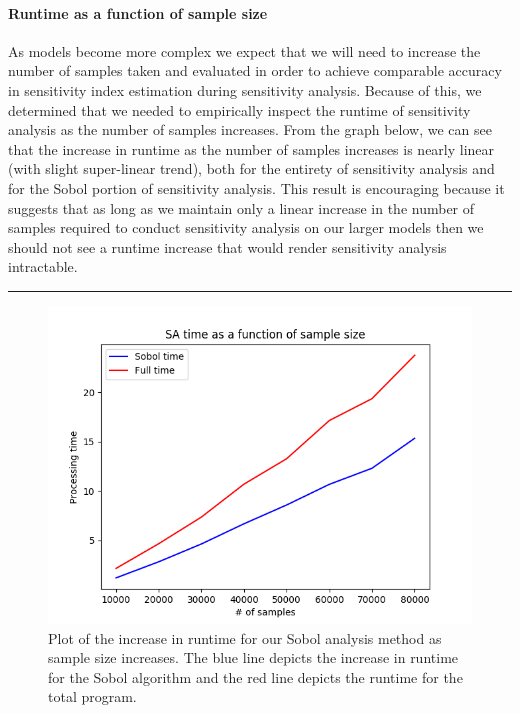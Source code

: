 \documentclass[article, 12pt, oneside]{memoir}
\begin{document}
\hypertarget{runtime-as-a-function-of-sample-size}{%
\paragraph{Runtime as a function of sample
size}\label{runtime-as-a-function-of-sample-size}}

As models become more complex we expect that we will need to increase
the number of samples taken and evaluated in order to achieve comparable
accuracy in sensitivity index estimation during sensitivity analysis.
Because of this, we determined that we needed to empirically inspect the
runtime of sensitivity analysis as the number of samples increases. From
the graph below, we can see that the increase in runtime as the number
of samples increases is nearly linear (with slight super-linear trend),
both for the entirety of sensitivity analysis and for the Sobol portion
of sensitivity analysis. This result is encouraging because it suggests
that as long as we maintain only a linear increase in the number of
samples required to conduct sensitivity analysis on our larger models
then we should not see a runtime increase that would render sensitivity
analysis intractable.

\begin{center}\rule{0.5\linewidth}{\linethickness}\end{center}

\begin{figure}
\centering
\includegraphics{figs/sa_samples_vs_runtime.png}
\caption{Plot of the increase in runtime for our Sobol analysis method
as sample size increases. The blue line depicts the increase in runtime
for the Sobol algorithm and the red line depicts the runtime for the
total program.}
\end{figure}
\end{document}
